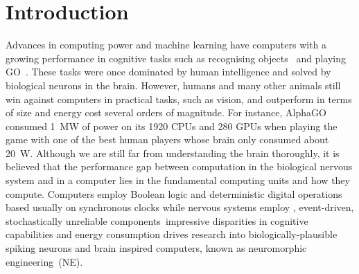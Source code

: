 \chapter{Introduction}
\label{cha:intro}
Advances in computing power and machine learning have \DIFdelbegin {}\DIFdelend \DIFaddbegin {}\DIFaddend computers with a \DIFdelbegin {}\DIFdelend \DIFaddbegin {}\DIFaddend growing performance in cognitive tasks \DIFdelbegin \DIFdel{, }\DIFdelend such as recognising objects~\citep{deng2009imagenet} and playing GO~\citep{silver2016mastering}\DIFdelbegin \DIFdel{)}\DIFdelend . 
These tasks were once dominated by human intelligence and solved by biological neurons in the brain.
However, humans and many other animals still win against computers in practical tasks, such as vision, and outperform \DIFaddbegin {}\DIFaddend in terms of size and energy cost \DIFdelbegin {}\DIFdelend \DIFaddbegin {}\DIFaddend several orders of magnitude.
For instance, AlphaGO~\citep{silver2016mastering} consumed 1~MW of power on its 1920 CPUs and 280 GPUs when playing the game with one of the best human players whose brain only consumed about 20~W.
Although we are still far from understanding the brain thoroughly, it is believed that the performance gap between computation in the biological nervous system and in a computer lies in the fundamental computing units and how they compute.
Computers employ Boolean logic and deterministic digital operations based usually on synchronous clocks while nervous systems employ \DIFdelbegin {}\DIFdelend \DIFaddbegin {}\DIFaddend , event-driven, stochastically unreliable components~\citep{indiveri2009artificial}\DIFdelbegin {}\DIFdelend \DIFaddbegin {}\DIFaddend impressive disparities in cognitive capabilities and energy consumption drives \DIFdelbegin {}\DIFdelend research into biologically-plausible spiking neurons and brain inspired computers, known as neuromorphic engineering~(NE).


